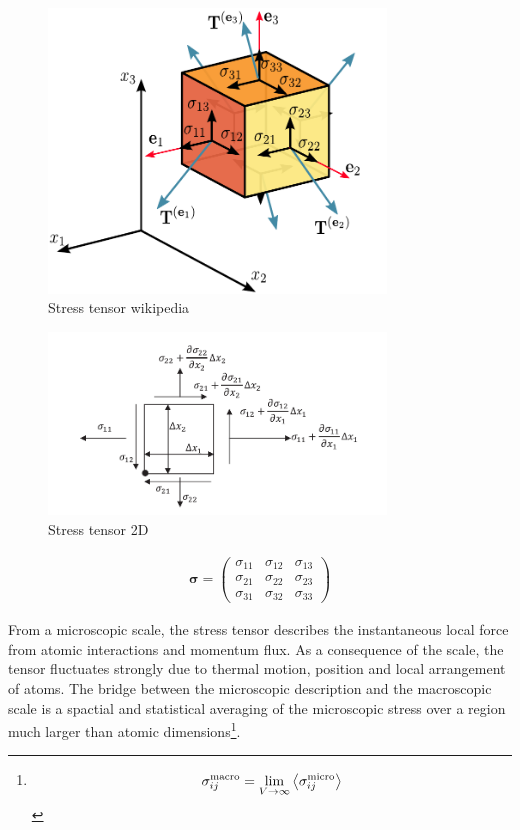 \begin{figure}[ht!]
    \centering
    \includegraphics[width=0.8\textwidth]{figs/Components_stress_tensor_cartesian.pdf}
    \caption{Stress tensor wikipedia}
\end{figure}

\begin{figure}[ht!]
    \centering
    \includegraphics[width=0.8\textwidth]{figs/StressTensor.png}
    \caption{Stress tensor 2D}
\end{figure}

\begin{gather}
    \bm{\sigma} = \begin{pmatrix}\sigma_{11} & \sigma_{12} & \sigma_{13} \\ \sigma_{21} & \sigma_{22} & \sigma_{23} \\ \sigma_{31} & \sigma_{32} & \sigma_{33} \end{pmatrix}
\end{gather}

From a microscopic scale, the stress tensor describes the instantaneous local force from atomic interactions and momentum flux.
As a consequence of the scale, the tensor fluctuates strongly due to thermal motion, position and local arrangement of atoms.
The bridge between the microscopic description and the macroscopic scale is a spactial and statistical averaging of the microscopic stress over a region much larger than atomic dimensions\footnote{\[\sigma_{ij}^{\mathrm{macro}}=\lim_{V\to\infty}\expval{\sigma_{ij}^{\mathrm{micro}}}\]}.



